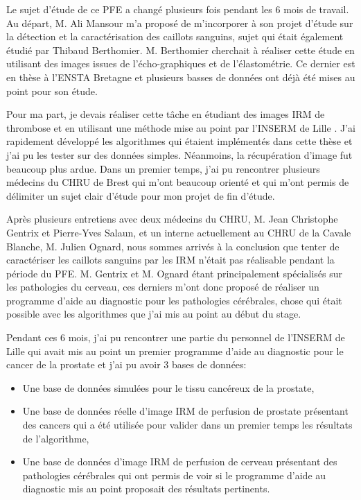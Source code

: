 Le sujet d'étude de ce PFE a changé plusieurs fois pendant les 6 mois de travail. Au départ, M. Ali Mansour m'a proposé de m'incorporer à son projet d'étude sur la détection et la caractérisation des caillots sanguins, sujet qui était également étudié par Thibaud Berthomier. M. Berthomier cherchait à réaliser cette étude en utilisant des images issues de l'écho-graphiques et de l'élastométrie. Ce dernier est en thèse à l'ENSTA Bretagne et plusieurs basses de données ont déjà été mises au point pour son étude. 

\medskip

Pour ma part, je devais réaliser cette tâche en étudiant des images IRM de thrombose et en utilisant une méthode mise au point par l'INSERM de Lille \cite{tartare2014contribution}. J'ai rapidement développé les algorithmes qui étaient implémentés dans cette thèse et j'ai pu les tester sur des données simples. Néanmoins, la récupération d'image fut beaucoup plus ardue. Dans un premier temps, j'ai pu rencontrer plusieurs médecins du CHRU de Brest qui m'ont beaucoup orienté et qui m'ont permis de délimiter un sujet clair d'étude pour mon projet de fin d'étude.

\medskip

Après plusieurs entretiens avec deux médecins du CHRU, M. Jean Christophe Gentrix et Pierre-Yves Salaun, et un interne actuellement au CHRU de la Cavale Blanche, M. Julien Ognard, nous sommes arrivés à la conclusion que tenter de caractériser  les caillots sanguins par les IRM n'était pas réalisable pendant la période du PFE. M. Gentrix et M. Ognard étant principalement spécialisés sur les pathologies du cerveau, ces derniers m'ont donc proposé de réaliser un programme d'aide au diagnostic pour les pathologies cérébrales, chose qui était possible avec les algorithmes que j'ai mis au point au début du stage.

\medskip

Pendant ces 6 mois, j'ai pu rencontrer une partie du personnel de l'INSERM de Lille qui avait mis au point un premier programme d'aide au diagnostic pour le cancer de la prostate et j'ai pu avoir 3 bases de données:

\begin{itemize}
\item Une base de données simulées pour le tissu cancéreux de la prostate,
\item Une base de données réelle d'image IRM de perfusion de prostate présentant des cancers qui a été utilisée pour valider dans un premier temps les résultats de l'algorithme,
\item Une base de données d'image IRM de perfusion de cerveau présentant des pathologies cérébrales qui ont permis de voir si le programme d'aide au diagnostic mis au point proposait des résultats pertinents.
\end{itemize}


